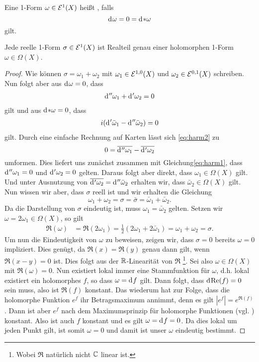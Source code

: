 \begin{defin}
  Eine 1-Form $\omega \in \mathcal{E}^1(X)$ heißt , falls
  \[
  \d[\omega] = 0 = \d[\ast \omega]
  \]
  gilt.
\end{defin}

\begin{thm}
  \label{thm:harm-form}
  Jede reelle 1-Form $\sigma \in \mathcal{E}^1(X)$ ist Realteil genau einer
  holomorphen 1-Form $\omega \in \Omega(X)$.
\end{thm}

\begin{proof}
  Wie können $\sigma = \omega_1 + \omega_2$ mit $\omega_1 \in
  \mathcal{E}^{1,0}(X)$ und $\omega_2 \in \mathcal{E}^{0,1}(X)$ schreiben. Nun
  folgt aber aus $\d[\omega] = 0$, dass
  \begin{align}
    \d[''\omega_1] + \d['\omega_2] = 0 \label{eq:harm1}
  \end{align}
  gilt und aus $\d[\ast \omega] = 0$, dass
  \begin{align}
  i(\d['\bar \omega_1] - \d[''\bar \omega_2]) = 0 \label{eq:harm2}
  \end{align}
  gilt. Durch eine einfache
  Rechnung auf Karten lässt sich \eqref{eq:harm2} zu
  \[
  0 = \overline{\d[''\omega_1]} - \overline{\d['\omega_2]}
  \]
  umformen. Dies liefert uns zunächst zusammen mit
  Gleichung\eqref{eq:harm1}, dass $\d[''\omega_1] = 0$ und $\d['\omega_2] = 0$
  gelten. Daraus folgt aber direkt, dass $\omega_1 \in \Omega(X)$
  gilt. Und unter Ausnutzung von $\overline{\d['\omega_2]} = \d[''
  \bar \omega_2]$ erhalten wir, dass $\bar \omega_2 \in \Omega(X)$
  gilt. Nun wissen wir aber, dass $\sigma$ reell ist und wir erhalten
  die Gleichung
  \[
  \omega_1 + \omega_2 = \sigma = \bar \sigma = \bar \omega_1 + \bar
  \omega_2.
  \]
  Da die Darstellung von $\sigma$ eindeutig ist, muss $\omega_1 =
  \bar \omega_2$ gelten. Setzen wir $\omega = 2\omega_1 \in
  \Omega(X)$, so gilt
  \begin{align*}
    \Re(\omega) & = \Re(2\omega_1) = \frac{1}{2}( 2 \omega_1 + 2 \bar
    \omega_1) = \omega_1 + \omega_2 = \sigma.
  \end{align*}
  Um nun die Eindeutigkeit von $\omega$ zu beweisen, zeigen wir, dass
  $\sigma = 0$ bereits $\omega = 0$ impliziert. Dies genügt, da
  $\Re(x) = \Re(y)$ genau dann gilt, wenn $\Re(x-y) = 0$ ist. Dies
  folgt aus der $\mathbb{R}$-Linearität von $\Re$ \footnote{Wobei $\Re$
  natürlich nicht $\mathbb{C}$ linear ist.}. Sei also $\omega \in \Omega(X)$
  mit $\Re(\omega) = 0$. Nun existiert lokal immer eine
  Stammfunktion für $\omega$, d.h. lokal existiert ein holomorphes
  $f$, so dass $\omega = \d[f]$ gilt. Dann folgt, dass
  $\d[\Re(f)] = 0$ sein muss, also ist $\Re(f)$ konstant. Das wiederum
  hat zur Folge, dass die holomorphe Funktion $e^f$ ihr
  Betragsmaximum annimmt, denn es gilt $|e^f| = e^{\Re(f)}$. Dann ist
  aber $e^f$ nach dem Maximumsprinzip für holomorphe Funktionen
  (vgl. \cite[Kor. 2.6]{For})
  konstant. Also ist auch $f$ konstant und es gilt $\omega = \d[f] =
  0$. Da dies lokal um jeden Punkt gilt, ist somit $\omega = 0$ und
  damit ist unser $\omega$ eindeutig bestimmt.
\end{proof}

